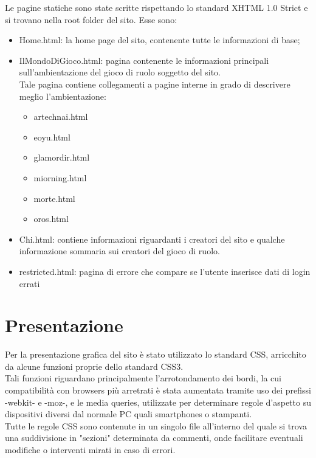 \documentclass{article}
\begin{document}
	Le pagine statiche sono state scritte rispettando lo standard XHTML 1.0 Strict e si trovano nella root folder del sito. Esse sono:\\
	
			\begin{itemize}
		\item Home.html: la home page del sito, contenente tutte le informazioni di base;\\
		\item IlMondoDiGioco.html: pagina contenente le informazioni principali sull'ambientazione del gioco di ruolo soggetto del sito.\\
		 Tale pagina contiene collegamenti a pagine interne in grado di descrivere meglio l'ambientazione:\\
		 \begin{itemize}
			\item artechnai.html\\
			\item eoyu.html\\
			\item glamordir.html\\
			\item miorning.html\\
			\item morte.html\\
			\item oros.html\\
			
		\end{itemize}
		\item Chi.html: contiene informazioni riguardanti i creatori del sito e qualche informazione sommaria sui creatori del gioco di ruolo.\\
		\item restricted.html: pagina di errore che compare se l'utente inserisce dati di login errati\\
		\end{itemize}

 \newpage

\section{Presentazione}
	Per la presentazione grafica del sito è stato utilizzato lo standard CSS, arricchito da alcune funzioni proprie dello standard CSS3.\\ Tali funzioni riguardano principalmente l'arrotondamento dei bordi, la cui compatibilità con browsers più arretrati è stata aumentata tramite uso dei prefissi -webkit- e -moz-, e le media queries, utilizzate per determinare regole d'aspetto su dispositivi diversi dal normale PC quali smartphones o stampanti.\\
	Tutte le regole CSS sono contenute in un singolo file all'interno del quale si trova una suddivisione in "sezioni" determinata da commenti, onde facilitare eventuali modifiche o interventi mirati in caso di errori.\\
	
\end{document}
